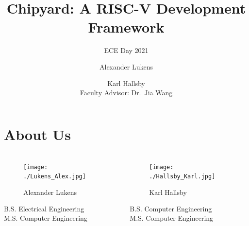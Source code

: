 \documentclass{eceday}
\title[Chipyard]{Chipyard: A RISC-V Development Framework}
\subtitle{ECE Day 2021}
\author{Alexander Lukens \and Karl Hallsby \\ Faculty Advisor: Dr.\ Jia Wang}
\institute{Illinois Institute of Technology}
\date{\DTMdisplaydate{2021}{4}{9}{-1}}
\begin{document}
\nocite{chipyard}
\nocite{firesimChipyardOverview}

\begin{frame}
  \titlepage{}
\end{frame}

\section{About Us}\label{sec:About_Us}
\begin{frame}
  \frametitle{}
  \begin{columns}
    \begin{column}{0.50\linewidth}
      \begin{figure}[h!tbp]
        \centering
        \texttt{[image: ./Lukens\_Alex.jpg]}
        \caption*{Alexander Lukens}
        \label{fig:Alex_Lukens}
      \end{figure}
  		\begin{center}
          B.S. Electrical Engineering \\
          M.S. Computer Engineering
  		\end{center}
    \end{column}
    \begin{column}{0.50\linewidth}
      \begin{figure}[h!tbp]
        \centering
        \texttt{[image: ./Hallsby\_Karl.jpg]}
        \caption*{Karl Hallsby}
        \label{fig:Karl_Hallsby}
      \end{figure}
      \begin{center}
        B.S. Computer Engineering \\
        M.S. Computer Engineering
      \end{center}
    \end{column}
  \end{columns}
\end{frame}
\end{document}
